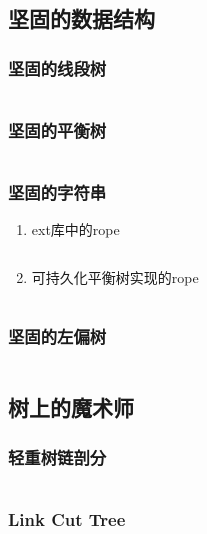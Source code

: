 \documentclass[a4paper]{article}
\newcommand{\cppcode}[1]{
    \inputminted[mathescape]{cpp}{source/#1}
}
\begin{document}
\cppcode{data-structure/splay.cpp}

\subsection{坚固的数据结构}

\subsubsection{坚固的线段树}

\cppcode{data-structure/persistent-segment-tree.cpp}

\subsubsection{坚固的平衡树}

\cppcode{data-structure/persistent-treap.cpp}

\subsubsection{坚固的字符串}

\begin{enumerate}
	\item ext库中的rope
		\cppcode{data-structure/crope.cpp}
	\item 可持久化平衡树实现的rope
		\cppcode{data-structure/rope.cpp}
\end{enumerate}

\subsubsection{坚固的左偏树}

\cppcode{data-structure/persistent-leftist-tree.cpp}

\subsection{树上的魔术师}

\subsubsection{轻重树链剖分}

\cppcode{data-structure/heavy-light-decomposition.cpp}

\subsubsection{Link Cut Tree}
\end{document}
